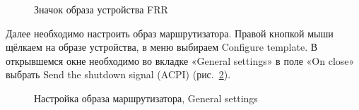 \documentclass[
  english,
  russian,
  12pt,
  a4paper,
  DIV=11,
  numbers=noendperiod]{scrreprt}
\begin{document}
\begin{figure}


\caption{\label{fig-019}Значок образа устройства FRR}

\end{figure}%

Далее необходимо настроить образ маршрутизатора. Правой кнопкой мыши
щёлкаем на образе устройства, в меню выбираем Configure template. В
открывшемся окне необходимо во вкладке «General settings» в поле «On
close» выбрать Send the shutdown signal (ACPI) (рис.~\ref{fig-020}).

\begin{figure}


\caption{\label{fig-020}Настройка образа маршрутизатора, General
settings}

\end{figure}%
\end{document}
